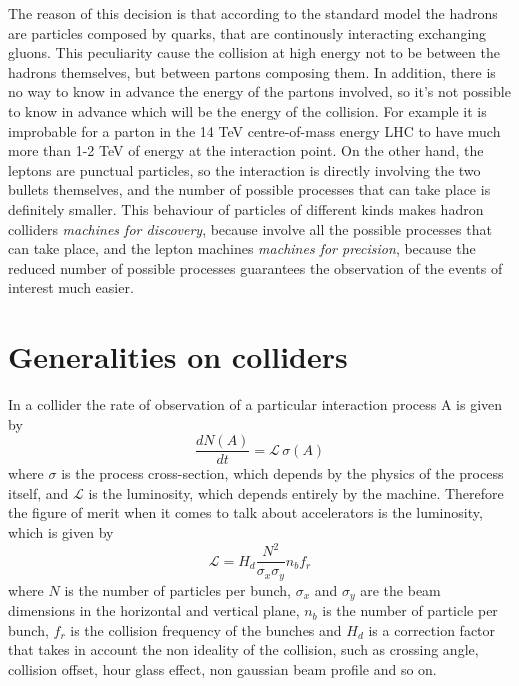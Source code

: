 The reason of this decision is that according to the standard model the hadrons are particles composed by quarks, that are continously interacting exchanging gluons. This peculiarity cause the collision at high energy not to be between the hadrons themselves, but between partons composing them. In addition, there is no way to know in advance the energy of the partons involved, so it's not possible to know in advance which will be the energy of the collision. For example it is improbable for a parton in the 14 TeV centre-of-mass energy LHC to have much more than 1-2 TeV of energy at the interaction point\cite{LHC:partonDistrib}. On the other hand, the leptons are punctual particles, so the interaction is directly involving the two bullets themselves, and the number of possible processes that can take place is definitely smaller. 
This behaviour of particles of different kinds makes hadron colliders \textit{machines for discovery}, because involve all the possible processes that can take place, and the lepton machines \textit{machines for precision}, because the reduced number of possible processes guarantees the observation of the events of interest much easier.

\section{Generalities on colliders}

In a collider the rate of observation of  a particular interaction process A is given by
\[
\frac{dN(A)}{dt} = \mathscr{L} \, \sigma(A)
\]
where $\sigma$ is the process cross-section, which depends by the physics of the process itself, and $\mathscr{L}$ is the luminosity, which depends entirely by the machine.
Therefore the figure of merit when it comes to talk about accelerators is the luminosity, which is given by
\[
\mathscr{L} = H_d \frac{N^2}{\sigma_x \sigma_y} n_b f_r
\]
where $N$ is the number of particles per bunch, $\sigma_x$ and $\sigma_y$ are the beam dimensions in the horizontal and vertical plane, $n_b$ is the number of particle per bunch, $f_r$ is the collision frequency of the bunches and $H_d$ is a correction factor that takes in account the non ideality of the collision, such as crossing angle, collision offset, hour glass effect, non gaussian beam profile and so on.

